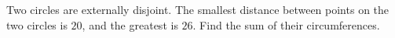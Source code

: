Two circles are externally disjoint. The smallest distance between points on the two circles is $20$, and the greatest is $26$. Find the sum of their circumferences.
